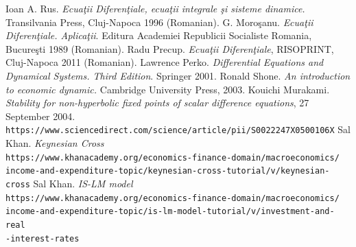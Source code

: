 \documentclass[a4paper,11pt]{report}
\begin{document}
\begin{thebibliography}{9}
 Ioan A. Rus. \textit{Ecua\c{t}ii Diferen\c{t}iale, ecua\c{t}ii integrale \c{s}i sisteme dinamice.} Transilvania Press, Cluj-Napoca 1996 (Romanian).
 G. Moro\c{s}anu. \textit{Ecua\c{t}ii Diferen\c{t}iale. Aplica\c{t}ii}. Editura Academiei Republicii Socialiste Romania, Bucure\c{s}ti 1989 (Romanian).
 Radu Precup. \textit{Ecua\c{t}ii Diferen\c{t}iale}, RISOPRINT, Cluj-Napoca 2011 (Romanian).
 Lawrence Perko. \textit{Differential Equations and Dynamical Systems. Third Edition}. Springer 2001.
 Ronald Shone. \textit{An introduction to economic dynamic.} Cambridge University Press, 2003.
 Kouichi Murakami. \textit{Stability for non-hyperbolic fixed points of scalar difference equations}, 27 September 2004.
 \\\texttt{https://www.sciencedirect.com/science/article/pii/S0022247X0500106X}
 Sal Khan. \textit{Keynesian Cross}
 \\\texttt{https://www.khanacademy.org/economics-finance-domain/macroeconomics/\\income-and-expenditure-topic/keynesian-cross-tutorial/v/keynesian-cross}
 Sal Khan. \textit{IS-LM model}
 \\\texttt{https://www.khanacademy.org/economics-finance-domain/macroeconomics/\\income-and-expenditure-topic/is-lm-model-tutorial/v/investment-and-real\\-interest-rates}
\end{thebibliography}
\end{document}
